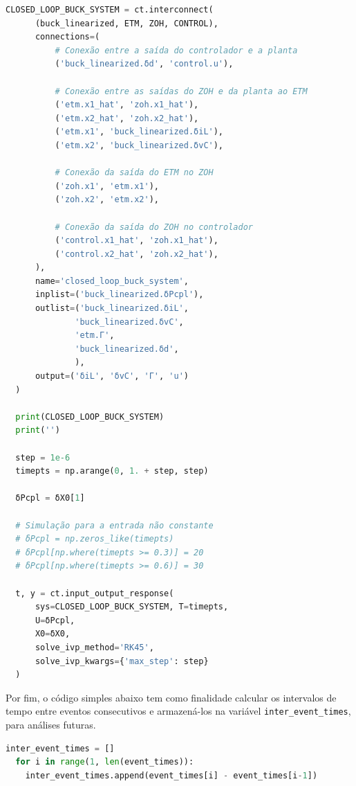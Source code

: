 \vspace{8pt}
\begin{lstlisting}[language=Python, caption={Sistema em loop fechado sob o ETC.}, label=cod:closed_loop]
  CLOSED_LOOP_BUCK_SYSTEM = ct.interconnect(
      (buck_linearized, ETM, ZOH, CONTROL),
      connections=(
          # Conexão entre a saída do controlador e a planta
          ('buck_linearized.δd', 'control.u'),

          # Conexão entre as saídas do ZOH e da planta ao ETM
          ('etm.x1_hat', 'zoh.x1_hat'),
          ('etm.x2_hat', 'zoh.x2_hat'),
          ('etm.x1', 'buck_linearized.δiL'),
          ('etm.x2', 'buck_linearized.δvC'),

          # Conexão da saída do ETM no ZOH
          ('zoh.x1', 'etm.x1'),
          ('zoh.x2', 'etm.x2'),

          # Conexão da saída do ZOH no controlador
          ('control.x1_hat', 'zoh.x1_hat'),
          ('control.x2_hat', 'zoh.x2_hat'),
      ),
      name='closed_loop_buck_system',
      inplist=('buck_linearized.δPcpl'),
      outlist=('buck_linearized.δiL',
              'buck_linearized.δvC',
              'etm.Γ',
              'buck_linearized.δd',
              ),
      output=('δiL', 'δvC', 'Γ', 'u')
  )

  print(CLOSED_LOOP_BUCK_SYSTEM)
  print('')

  step = 1e-6
  timepts = np.arange(0, 1. + step, step)

  δPcpl = δX0[1]

  # Simulação para a entrada não constante
  # δPcpl = np.zeros_like(timepts)
  # δPcpl[np.where(timepts >= 0.3)] = 20
  # δPcpl[np.where(timepts >= 0.6)] = 30

  t, y = ct.input_output_response(
      sys=CLOSED_LOOP_BUCK_SYSTEM, T=timepts,
      U=δPcpl,
      X0=δX0,
      solve_ivp_method='RK45',
      solve_ivp_kwargs={'max_step': step}
  )
\end{lstlisting}

Por fim, o código simples abaixo tem como finalidade calcular os intervalos de tempo entre eventos consecutivos e armazená-los na variável \texttt{inter\_event\_times}, para análises futuras.

\vspace{8pt}
\begin{lstlisting}[language=Python, caption={Cálculo da intervalo entre eventos.}, label=cod:closed_loop]
  inter_event_times = []
  for i in range(1, len(event_times)):
    inter_event_times.append(event_times[i] - event_times[i-1])
\end{lstlisting}
